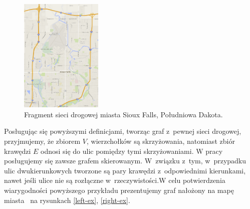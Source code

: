 \documentclass[twoside,12pt]{report}
\begin{document}
\begin{figure}[ht]
\begin{center}
\includegraphics[width=0.35\textwidth]{img/siec}
\caption{Fragment sieci drogowej miasta Sioux Falls, Południowa Dakota.} 
\end{center}
\end{figure}

Posługując się powyższymi definicjami, tworząc graf z~pewnej sieci drogowej, przyjmujemy, że zbiorem $V$, wierzchołków są skrzyżowania, natomiast zbiór krawędzi $E$ odnosi się do ulic pomiędzy tymi skrzyżowaniami.
W pracy posługujemy się zawsze grafem skierowanym. W~związku z~tym, w~przypadku ulic dwukierunkowych tworzone są pary krawędzi z~odpowiednimi kierunkami, nawet jeśli ulice nie są rozłączne w~rzeczywistości.W celu potwierdzenia wiarygodności powyższego przykładu prezentujemy graf nałożony na mapę miasta~\cite{siux} na rysunkach \ref{left-ex}, \ref{right-ex}.
\end{document}
